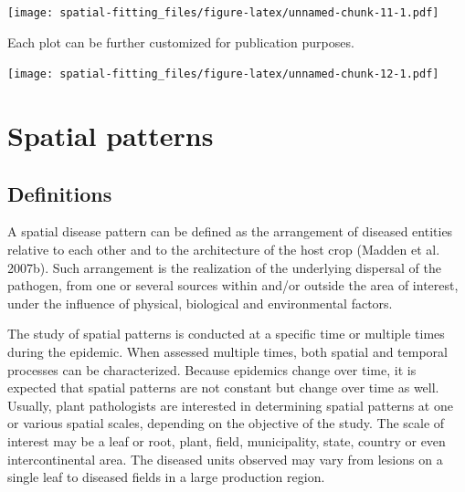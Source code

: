 \documentclass[
  letterpaper,
]{book}
\newenvironment{Shaded}{\begin{snugshade}}{\end{snugshade}}
\newcommand{\AttributeTok}[1]{\textcolor[rgb]{0.40,0.45,0.13}{#1}}
\newcommand{\CommentTok}[1]{\textcolor[rgb]{0.37,0.37,0.37}{#1}}
\newcommand{\FunctionTok}[1]{\textcolor[rgb]{0.28,0.35,0.67}{#1}}
\newcommand{\NormalTok}[1]{\textcolor[rgb]{0.00,0.23,0.31}{#1}}
\newcommand{\SpecialCharTok}[1]{\textcolor[rgb]{0.37,0.37,0.37}{#1}}
\newcommand{\StringTok}[1]{\textcolor[rgb]{0.13,0.47,0.30}{#1}}
\begin{document}
\begin{Shaded}
\end{Shaded}

\texttt{[image: spatial-fitting\_files/figure-latex/unnamed-chunk-11-1.pdf]}

Each plot can be further customized for publication purposes.

\begin{Shaded}
\end{Shaded}

\texttt{[image: spatial-fitting\_files/figure-latex/unnamed-chunk-12-1.pdf]}

\hypertarget{spatial-patterns}{%
\chapter{Spatial patterns}\label{spatial-patterns}}

\hypertarget{definitions-1}{%
\section{Definitions}\label{definitions-1}}

A spatial disease pattern can be defined as the arrangement of diseased
entities relative to each other and to the architecture of the host crop
(Madden et al. 2007b). Such arrangement is the realization of the
underlying dispersal of the pathogen, from one or several sources within
and/or outside the area of interest, under the influence of physical,
biological and environmental factors.

The study of spatial patterns is conducted at a specific time or
multiple times during the epidemic. When assessed multiple times, both
spatial and temporal processes can be characterized. Because epidemics
change over time, it is expected that spatial patterns are not constant
but change over time as well. Usually, plant pathologists are interested
in determining spatial patterns at one or various spatial scales,
depending on the objective of the study. The scale of interest may be a
leaf or root, plant, field, municipality, state, country or even
intercontinental area. The diseased units observed may vary from lesions
on a single leaf to diseased fields in a large production region.
\end{document}
